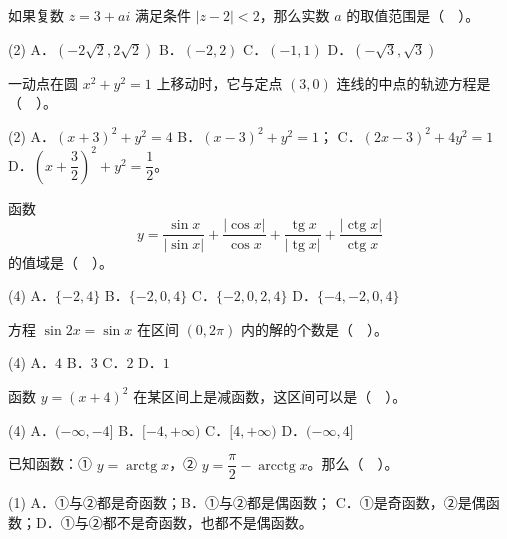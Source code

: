 \begin{question}
如果复数 $z=3+ai$ 满足条件 $|z-2|<2$，那么实数 $a$ 的取值范围是（　）。

\begin{gkopts}(2)
\task A．$(-2\sqrt2,2\sqrt2)$
\task B．$(-2,2)$
\task C．$(-1,1)$
\task D．$(-\sqrt3,\sqrt3)$
\end{gkopts}

\end{question}
\begin{question}
一动点在圆 $x^2+y^2=1$ 上移动时，它与定点 $(3,0)$ 连线的中点的轨迹方程是（　）。

\begin{gkopts}(2)
\task A．$(x+3)^2+y^2=4$
\task B．$(x-3)^2+y^2=1$；
\task C．$(2x-3)^2+4y^2=1$
\task D．$\left(x+\dfrac32\right)^2+y^2=\dfrac12$。
\end{gkopts}

\end{question}
\begin{question}
函数
\nopagebreak[4]
\[
y=\frac{\sin x}{|\sin x|}+\frac{|\cos x|}{\cos x}+\frac{\operatorname{tg}x}{|\operatorname{tg}x|}+\frac{|\operatorname{ctg}x|}{\operatorname{ctg}x}
\]
的值域是（　）。

\begin{gkopts}(4)
\task A．$\{-2,4\}$
\task B．$\{-2,0,4\}$
\task C．$\{-2,0,2,4\}$
\task D．$\{-4,-2,0,4\}$
\end{gkopts}

\end{question}
\begin{question}
方程 $\sin 2x=\sin x$ 在区间 $(0,2\pi)$ 内的解的个数是（　）。

\begin{gkopts}(4)
\task A．$4$
\task B．$3$
\task C．$2$
\task D．$1$
\end{gkopts}

\end{question}
\begin{question}
函数 $y=(x+4)^2$ 在某区间上是减函数，这区间可以是（　）。

\begin{gkopts}(4)
\task A．$(-\infty,-4]$
\task B．$[-4,+\infty)$
\task C．$[4,+\infty)$
\task D．$(-\infty,4]$
\end{gkopts}

\end{question}
\begin{question}
已知函数：① $y=\operatorname{arctg}x$，② $y=\dfrac\pi2-\operatorname{arcctg}x$。那么（　）。

\begin{gkopts}(1)
\task A．①与②都是奇函数；B．①与②都是偶函数；
\task C．①是奇函数，②是偶函数；D．①与②都不是奇函数，也都不是偶函数。
\end{gkopts}

\end{question}
